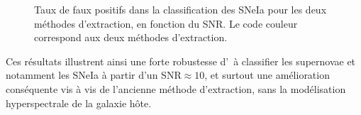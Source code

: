 \documentclass[../main/main.tex]{subfiles}
\begin{document}
\begin{figure}[ht]
  \centering
  \caption[Taux de faux positifs dans la classification des SNeIa.]{Taux de
    faux positifs dans la classification des SNeIa pour les deux
    méthodes d'extraction, en fonction du SNR. Le code couleur
    correspond aux deux méthodes d'extraction.}
  \label{fig:falsepositivesIa}
\end{figure}

Ces résultats illustrent ainsi une forte robustesse d'\hypergal\ à
classifier les supernovae et notamment les SNeIa à partir d'un
SNR$\approx10$, et surtout une amélioration conséquente vis à vis de
l'ancienne méthode d'extraction, sans la modélisation hyperspectrale de
la galaxie hôte. 

%
%
\end{document}
